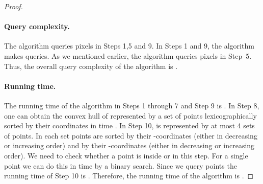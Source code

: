 \documentclass[11pt,english]{article}
\numberwithin{figure}{section}
\begin{document}
\begin{proof}
\paragraph{Query complexity.} The algorithm queries pixels in Steps 1,5 and 9.
In Steps 1 and 9, the algorithm makes  queries. As we mentioned earlier, the
algorithm queries  pixels in Step~5. Thus, the overall query
complexity of the algorithm is .

\paragraph{Running time.} The running time of the algorithm in Steps 1 through
7 and Step 9 is . In Step 8, one can
obtain the convex hull of  represented by a set of
 points lexicographically sorted by their coordinates
in time . In Step 10,  is represented
by at most 4 sets of  points. In each set points are sorted
by their -coordinates (either in decreasing or increasing order) and by
their -coordinates (either in decreasing or increasing order).
We need to check whether a point is inside  or  in this step. For a single point we can do
this in time  by a
binary search. Since we query  points the running
time of Step 10 is . Therefore, the running time
of the algorithm is .
\end{proof}
\end{document}
